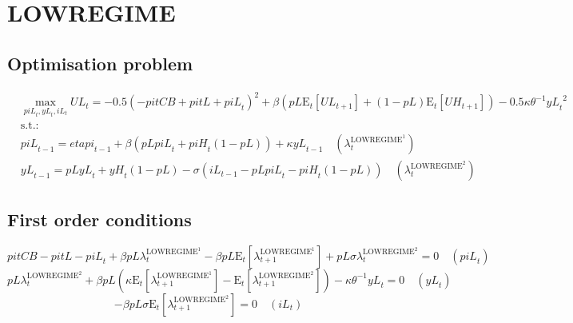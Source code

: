 \section{LOWREGIME}

\subsection{Optimisation problem}

\begin{align}
&\max_{{p\!i\!L}_{t}, {y\!L}_{t}, {i\!L}_{t}
} {U\!L}_{t} = -0.5\left(-{p\!i\!t\!C\!B} + {p\!i\!t\!L} + {p\!i\!L}_{t}\right)^{2} + {\beta} \left({{p\!L}} {\mathrm{E}_{t}\left[{U\!L}_{t+1}\right]} + \left(1 - {p\!L}\right) {\mathrm{E}_{t}\left[{U\!H}_{t+1}\right]}\right) - 0.5{\kappa} {\theta}^{-1} {{y\!L}_{t}}^{2}\\
&\mathrm{s.t.:}\nonumber\\
& {p\!i\!L}_{t-1} = {e\!t\!a\!p\!i}_{t-1} + {\beta} \left({{p\!L}} {{p\!i\!L}_{t}} + {{p\!i\!H}_{t}} \left(1 - {p\!L}\right)\right) + {\kappa} {{y\!L}_{t-1}} \quad \left(\lambda^{\mathrm{LOWREGIME}^{\mathrm{1}}}_{t}\right)\\
& {y\!L}_{t-1} = {{p\!L}} {{y\!L}_{t}} + {{y\!H}_{t}} \left(1 - {p\!L}\right) - {\sigma} \left({i\!L}_{t-1} - {{p\!L}} {{p\!i\!L}_{t}} - {{p\!i\!H}_{t}} \left(1 - {p\!L}\right)\right) \quad \left(\lambda^{\mathrm{LOWREGIME}^{\mathrm{2}}}_{t}\right)
\end{align}


\subsection{First order conditions}

\begin{equation}
{p\!i\!t\!C\!B} - {p\!i\!t\!L} - {p\!i\!L}_{t} + {\beta} {{p\!L}} {\lambda^{\mathrm{LOWREGIME}^{\mathrm{1}}}_{t}} - {\beta} {{p\!L}} {\mathrm{E}_{t}\left[\lambda^{\mathrm{LOWREGIME}^{\mathrm{1}}}_{t+1}\right]} + {{p\!L}} {\sigma} {\lambda^{\mathrm{LOWREGIME}^{\mathrm{2}}}_{t}} = 0
 \quad \left({p\!i\!L}_{t}\right)
\end{equation}
\begin{equation}
{{p\!L}} {\lambda^{\mathrm{LOWREGIME}^{\mathrm{2}}}_{t}} + {\beta} {{p\!L}} \left({\kappa} {\mathrm{E}_{t}\left[\lambda^{\mathrm{LOWREGIME}^{\mathrm{1}}}_{t+1}\right]} - \mathrm{E}_{t}\left[\lambda^{\mathrm{LOWREGIME}^{\mathrm{2}}}_{t+1}\right]\right) - {\kappa} {\theta}^{-1} {{y\!L}_{t}} = 0
 \quad \left({y\!L}_{t}\right)
\end{equation}
\begin{equation}
-{\beta} {{p\!L}} {\sigma} {\mathrm{E}_{t}\left[\lambda^{\mathrm{LOWREGIME}^{\mathrm{2}}}_{t+1}\right]} = 0
 \quad \left({i\!L}_{t}\right)
\end{equation}




